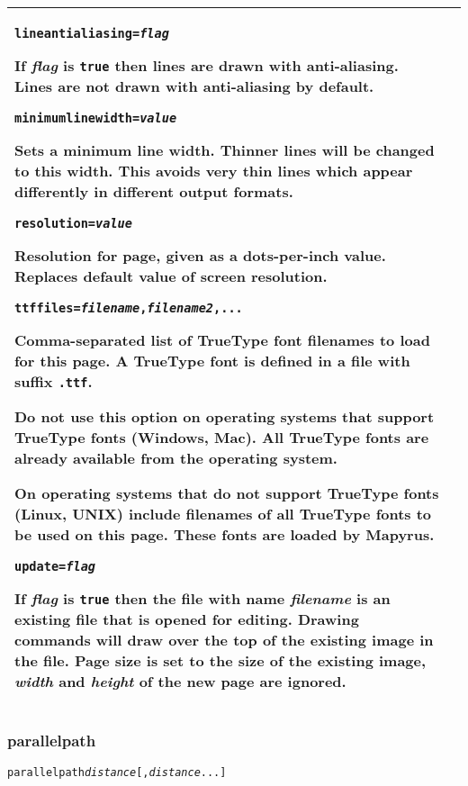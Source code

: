 \begin{longtable}{|p{4cm}|p{10cm}|}
\vspace{10pt}
\texttt{lineantialiasing=\textit{flag}}

If \textit{flag} is \texttt{true} then
lines are drawn with anti-aliasing.
Lines are not drawn with anti-aliasing by default.

\vspace{10pt}
\texttt{minimumlinewidth=\textit{value}}

Sets a minimum line width.  Thinner lines will be changed to
this width.  This avoids very thin lines which appear differently
in different output formats.

\vspace{10pt}
\texttt{resolution=\textit{value}}

Resolution for page, given as a dots-per-inch value.  Replaces
default value of screen resolution.

\vspace{10pt}
\texttt{ttffiles=\textit{filename},\textit{filename2},...}

Comma-separated list of TrueType font filenames
to load for this page.
A TrueType font is defined in a file
with suffix \texttt{.ttf}.

Do not use this option on operating systems that support
TrueType fonts (Windows, Mac).  All TrueType
fonts are already available from the operating system.

On operating systems that do not support TrueType fonts
(Linux, UNIX) include filenames of all TrueType
fonts to be used on this page.  These fonts are loaded
by Mapyrus.

\vspace{10pt}
\texttt{update=\textit{flag}}

If \textit{flag} is \texttt{true} then the file with name
\textit{filename} is an existing file that is opened for editing.
Drawing commands will draw over the top of the existing image
in the file.
Page size is set to the size of the existing image,
\textit{width} and \textit{height} of the new page are ignored.  \\

\hline

\end{longtable}

\subsubsection{parallelpath}

\begin{alltt}
parallelpath \textit{distance} [, \textit{distance} ...]
\end{alltt}

